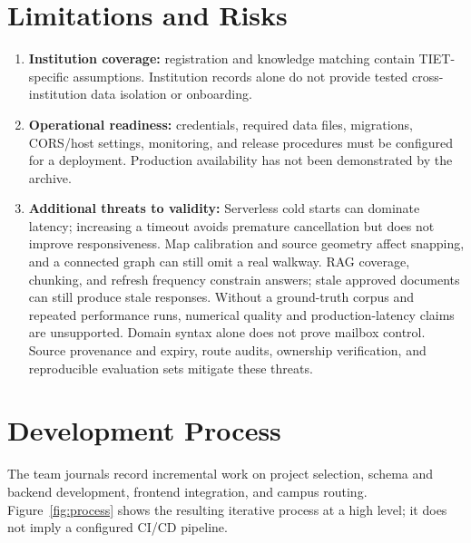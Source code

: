 \documentclass[11pt,a4paper]{report}
\begin{document}
\section{Limitations and Risks}
\begin{enumerate}[leftmargin=*]
  \item \textbf{Institution coverage:} registration and knowledge matching
    contain TIET-specific assumptions. Institution records alone do not provide
    tested cross-institution data isolation or onboarding.
  \item \textbf{Operational readiness:} credentials, required data files,
    migrations, CORS/host settings, monitoring, and release procedures must be
    configured for a deployment. Production availability has not been
    demonstrated by the archive.
  \item \textbf{Additional threats to validity:} Serverless cold starts can
    dominate latency; increasing a timeout avoids premature cancellation but
    does not improve responsiveness. Map calibration and source geometry affect
    snapping, and a connected graph can still omit a real walkway. RAG coverage,
    chunking, and refresh frequency constrain answers; stale approved documents
    can still produce stale responses. Without a ground-truth corpus and
    repeated performance runs, numerical quality and production-latency claims
    are unsupported. Domain syntax alone does not prove mailbox control.
    Source provenance and expiry, route audits, ownership verification, and
    reproducible evaluation sets mitigate these threats.
\end{enumerate}

\clearpage





\section{Development Process}
The team journals record incremental work on project selection, schema and
backend development, frontend integration, and campus routing.
Figure~\ref{fig:process} shows the resulting iterative process at a high
level; it does not imply a configured CI/CD pipeline.
\end{document}
